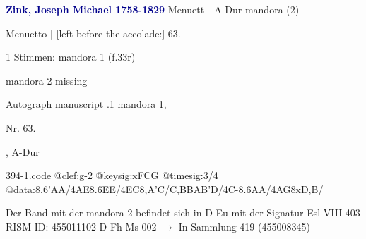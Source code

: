 \documentclass[twocolumn]{book}
\begin{document}
\newline \par \vspace{7pt} \textcolor{darkblue}{\textbf{Zink, Joseph Michael  1758-1829}}
\newline Menuett - A-Dur
\newline mandora (2)
\newline \begin{itshape}[f.33r, at left:] Menuetto | [left before the accolade:] 63.\end{itshape} 
\newline \textcolor{darkblue}{}  1 Stimmen: mandora 1  (f.33r)
\newline \begin{small} mandora 2 missing\end{small} 
\newline Autograph manuscript
.1  mandora 1, \begin{itshape}Nr. 63.\end{itshape}, A-Dur  
\begin{filecontents*}{394-1.code}
@clef:g-2
@keysig:xFCG
@timesig:3/4
@data:{8.6'AA}/4AE{8.6EE}/4EC{8,A'C}/C,BBA{B'D}/4C-{8.6AA}/4AG{8xD,B}/
\end{filecontents*}
\newline
%
\newline Der Band mit der mandora 2 befindet sich in D Eu mit der Signatur Esl VIII 403
\newline RISM-ID: 455011102
\newline D-Fh  Ms 002
\newline $\rightarrow$ In Sammlung 419 (455008345)
      
\end{document}
